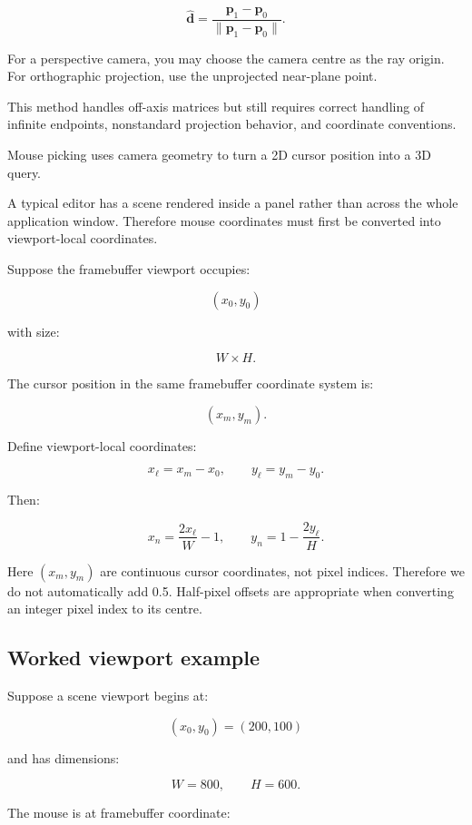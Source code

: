 \[ \boxed{ \hat{\mathbf d}= \frac{\mathbf p_1-\mathbf p_0} {\|\mathbf p_1-\mathbf p_0\|}. } \]

For a perspective camera, you may choose the camera centre as the ray origin. For orthographic projection, use the unprojected near-plane point.

This method handles off-axis matrices but still requires correct handling of infinite endpoints, nonstandard projection behavior, and coordinate conventions.

Mouse picking uses camera geometry to turn a 2D cursor position into a 3D query.

A typical editor has a scene rendered inside a panel rather than across the whole application window. Therefore mouse coordinates must first be converted into viewport-local coordinates.

Suppose the framebuffer viewport occupies:

\[ (x_0,y_0) \]

with size:

\[ W\times H. \]

The cursor position in the same framebuffer coordinate system is:

\[ (x_m,y_m). \]

Define viewport-local coordinates:

\[ \boxed{ x_\ell=x_m-x_0, \qquad y_\ell=y_m-y_0. } \]

Then:

\[ \boxed{ x_n=\frac{2x_\ell}{W}-1, \qquad y_n=1-\frac{2y_\ell}{H}. } \]

Here \((x_m,y_m)\) are continuous cursor coordinates, not pixel indices. Therefore we do not automatically add 0.5. Half-pixel offsets are appropriate when converting an integer pixel index to its centre.

\subsection{Worked viewport example}\label{02-foundations-ii-ch035-worked-viewport-example}

\hypertarget{02-foundations-ii-ch035-worked-viewport-example}{}

Suppose a scene viewport begins at:

\[ (x_0,y_0)=(200,100) \]

and has dimensions:

\[ W=800,\qquad H=600. \]

The mouse is at framebuffer coordinate:

